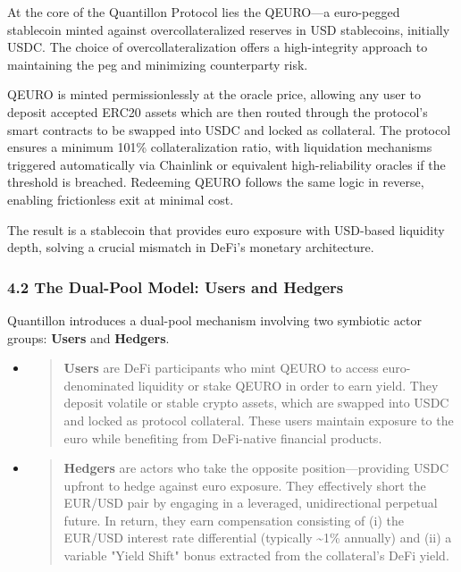 At the core of the Quantillon Protocol lies the QEURO---a euro-pegged
stablecoin minted against overcollateralized reserves in USD
stablecoins, initially USDC. The choice of overcollateralization offers
a high-integrity approach to maintaining the peg and minimizing
counterparty risk.

QEURO is minted permissionlessly at the oracle price, allowing any user
to deposit accepted ERC20 assets which are then routed through the
protocol's smart contracts to be swapped into USDC and locked as
collateral. The protocol ensures a minimum 101\% collateralization
ratio, with liquidation mechanisms triggered automatically via Chainlink
or equivalent high-reliability oracles if the threshold is breached.
Redeeming QEURO follows the same logic in reverse, enabling frictionless
exit at minimal cost.

The result is a stablecoin that provides euro exposure with USD-based
liquidity depth, solving a crucial mismatch in DeFi's monetary
architecture.

\hypertarget{the-dual-pool-model-users-and-hedgers}{%
\subsubsection{4.2 The Dual-Pool Model: Users and
Hedgers}\label{the-dual-pool-model-users-and-hedgers}}

Quantillon introduces a dual-pool mechanism involving two symbiotic
actor groups: \textbf{Users} and \textbf{Hedgers}.

\begin{itemize}
\item
  \begin{quote}
  \textbf{Users} are DeFi participants who mint QEURO to access
  euro-denominated liquidity or stake QEURO in order to earn yield. They
  deposit volatile or stable crypto assets, which are swapped into USDC
  and locked as protocol collateral. These users maintain exposure to
  the euro while benefiting from DeFi-native financial products.
  \end{quote}
\item
  \begin{quote}
  \textbf{Hedgers} are actors who take the opposite position---providing
  USDC upfront to hedge against euro exposure. They effectively short
  the EUR/USD pair by engaging in a leveraged, unidirectional perpetual
  future. In return, they earn compensation consisting of (i) the
  EUR/USD interest rate differential (typically \textasciitilde1\%
  annually) and (ii) a variable "Yield Shift" bonus extracted from the
  collateral's DeFi yield.
  \end{quote}
\end{itemize}

